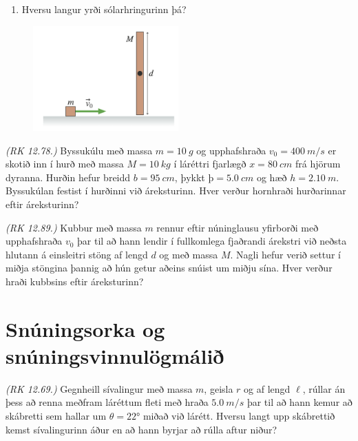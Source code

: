 \begin{enumerate}[label = \textbf{Dæmi \thechapter.\arabic*.}]
\begin{enumerate}[label = \textbf{(\alph*)}]
    \item Hversu langur yrði sólarhringurinn þá?
\end{enumerate}

\begin{minipage}{\linewidth}
\begin{figure}
\vspace{-0.75cm}
\includegraphics[width=2.2in]{images/klessahverfi.png}
\end{figure}

\item \textit{(RK 12.78.)} Byssukúlu með massa $m = \SI{10}{g}$ og upphafshraða $v_0 = \SI{400}{m/s}$ er skotið inn í hurð með massa $M = \SI{10}{kg}$ í láréttri fjarlægð $x = \SI{80}{cm}$ frá hjörum dyranna. Hurðin hefur breidd $b = \SI{95}{cm}$, þykkt $þ = \SI{5.0}{cm}$ og hæð $h = \SI{2.10}{m}$. Byssukúlan festist í hurðinni við áreksturinn. Hver verður hornhraði hurðarinnar eftir áreksturinn?

\item \textit{(RK 12.89.)} Kubbur með massa $m$ rennur eftir núninglausu yfirborði með upphafshraða $v_0$ þar til að hann lendir í fullkomlega fjaðrandi árekstri við neðsta hlutann á einsleitri stöng af lengd $d$ og með massa $M$. Nagli hefur verið settur í miðja stöngina þannig að hún getur aðeins snúist um miðju sína. Hver verður hraði kubbsins eftir áreksturinn?


\end{minipage}


\section*{Snúningsorka og snúningsvinnulögmálið}

\item \textit{(RK 12.69.)} Gegnheill sívalingur með massa $m$, geisla $r$ og af lengd $\ell$, rúllar án þess að renna meðfram láréttum fleti með hraða $\SI{5.0}{m/s}$ þar til að hann kemur að skábretti sem hallar um $\theta = \ang{22}$ miðað við lárétt. Hversu langt upp skábrettið kemst sívalingurinn áður en að hann byrjar að rúlla aftur niður?


\end{enumerate}
